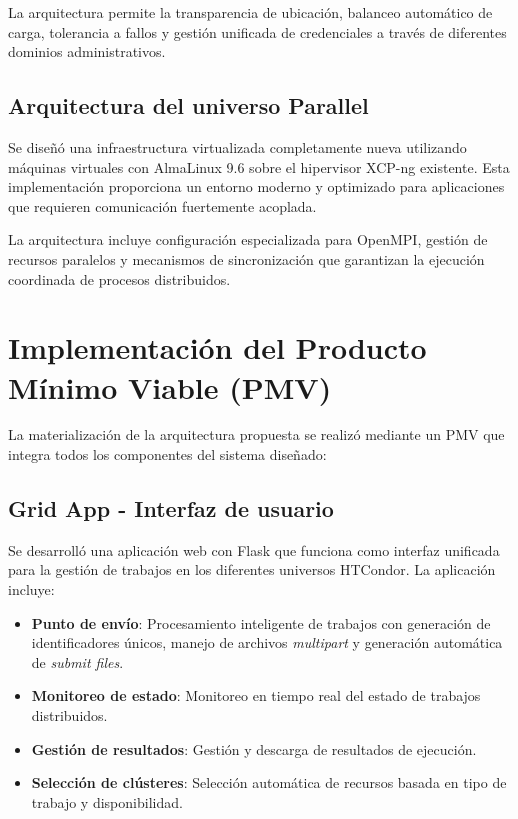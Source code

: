 La arquitectura permite la transparencia de ubicación, balanceo automático de carga, tolerancia a fallos y gestión unificada de credenciales a través de diferentes dominios administrativos.

\subsection{Arquitectura del universo Parallel}
\noindent

Se diseñó una infraestructura virtualizada completamente nueva utilizando máquinas virtuales con AlmaLinux 9.6 sobre el hipervisor XCP-ng existente. Esta implementación proporciona un entorno moderno y optimizado para aplicaciones \MPI que requieren comunicación fuertemente acoplada.

La arquitectura incluye configuración especializada para OpenMPI, gestión de recursos paralelos y mecanismos de sincronización que garantizan la ejecución coordinada de procesos distribuidos.

\section{Implementación del Producto Mínimo Viable (PMV)}
\noindent

La materialización de la arquitectura propuesta se realizó mediante un PMV que integra todos los componentes del sistema diseñado:

\subsection{Grid App - Interfaz de usuario}
\noindent

Se desarrolló una aplicación web con Flask que funciona como interfaz unificada para la gestión de trabajos en los diferentes universos HTCondor. La aplicación incluye:

\begin{itemize}
    \item \textbf{Punto de envío}: Procesamiento inteligente de trabajos con generación de identificadores únicos, manejo de archivos \textit{multipart} y generación automática de \textit{submit files}.
    \item \textbf{Monitoreo de estado}: Monitoreo en tiempo real del estado de trabajos distribuidos.
    \item \textbf{Gestión de resultados}: Gestión y descarga de resultados de ejecución.
    \item \textbf{Selección de clústeres}: Selección automática de recursos basada en tipo de trabajo y disponibilidad.
\end{itemize}


